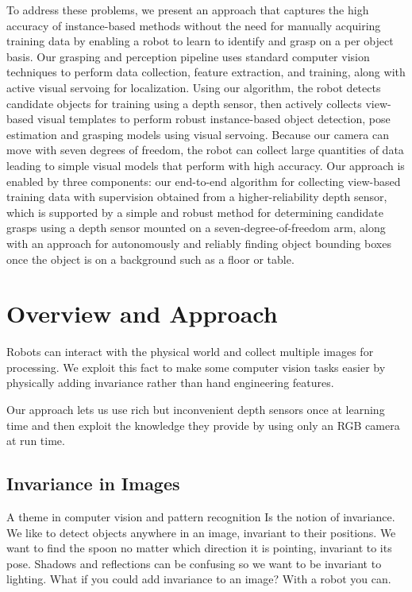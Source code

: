 \documentclass[graybox]{svmult}
\begin{document}
To address these problems, we present an approach that captures the
high accuracy of instance-based methods without the need for manually
acquiring training data by enabling a robot to learn to identify and
grasp on a per object basis. Our grasping and perception pipeline uses
standard computer vision techniques to perform data collection,
feature extraction, and training, along with active visual servoing
for localization.  Using our algorithm, the robot detects candidate
objects for training using a depth sensor, then actively collects
view-based visual templates to perform robust instance-based object
detection, pose estimation and grasping models using visual servoing.
Because our camera can move with seven degrees of freedom, the robot
can collect large quantities of data leading to simple visual models
that perform with high accuracy.  Our approach is enabled by three
components: our end-to-end algorithm for collecting view-based
training data with supervision obtained from a higher-reliability
depth sensor, which is supported by a simple and robust method for
determining candidate grasps using a depth sensor mounted on a
seven-degree-of-freedom arm, along with an approach for autonomously
and reliably finding object bounding boxes once the object is on a
background such as a floor or table.

\section{Overview and Approach}
Robots can interact with the physical world and collect multiple images
for processing. We exploit this fact to make some computer vision tasks
easier by physically adding invariance rather than hand engineering
features.

Our approach lets us use rich but inconvenient depth sensors once at learning
time and then exploit the knowledge they provide by using only an RGB
camera at run time.

\subsection{Invariance in Images}
A theme in computer vision and pattern recognition Is the notion of invariance.
We like to detect objects anywhere in an image, invariant to their positions.
We want to find the spoon no matter which direction it is pointing, invariant
to its pose. Shadows and reflections can be confusing so we want to be
invariant to lighting. What if you could add invariance to an image? With a
robot you can.
\end{document}

